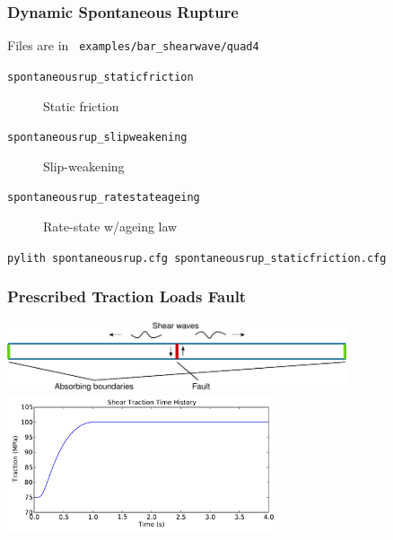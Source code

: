 \documentclass{beamer}
\begin{document}
\begin{frame}
  \frametitle{Dynamic Spontaneous Rupture}
  
  \vfill
  Files are in {\tt\color{red} examples/bar\_shearwave/quad4}
  \vfill

  \begin{description}
  \item[{\tt spontaneousrup\_staticfriction}] Static friction
  \item[{\tt spontaneousrup\_slipweakening}] Slip-weakening
  \item[{\tt spontaneousrup\_ratestateageing}] Rate-state w/ageing law
  \end{description}
  
  \vfill
  {\tt pylith spontaneousrup.cfg spontaneousrup\_staticfriction.cfg}
  \vfill

\end{frame}


\begin{frame}
  \frametitle{Prescribed Traction Loads Fault}

  \begin{center}
    \includegraphics[width=10.0cm]{figs/bar}\\ \vspace*{0.5cm}
    \includegraphics[width=8.0cm]{figs/bar_tractionth}
  \end{center}
  
\end{frame}


\end{document}
